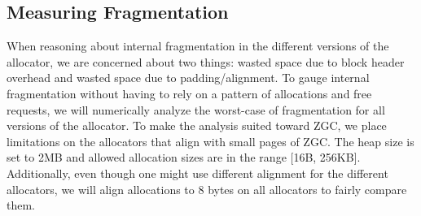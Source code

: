 

%



\subsection{Measuring Fragmentation}

When reasoning about internal fragmentation in the different versions of the allocator, we are concerned about two things: wasted space due to block header overhead and wasted space due to padding/alignment. To gauge internal fragmentation without having to rely on a pattern of allocations and free requests, we will numerically analyze the worst-case of fragmentation for all versions of the allocator. To make the analysis suited toward ZGC, we place limitations on the allocators that align with small pages of ZGC. The heap size is set to 2MB and allowed allocation sizes are in the range [16B, 256KB]. Additionally, even though one might use different alignment for the different allocators, we will align allocations to 8 bytes on all allocators to fairly compare them.

